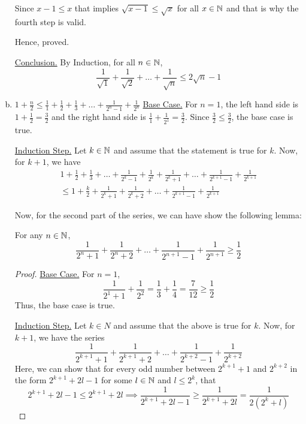 \begin{enumerate}[(a).]
		Since $x-1 \leq x$ that implies $\sqrt{x-1} \leq \sqrt{x}$ for all $x \in \mathbb{N}$ and that is why the fourth step is valid.

		Hence, proved.
		
		\underline{Conclusion.} By Induction, for all $n \in \mathbb{N}$,
		$$\frac{1}{\sqrt{1}} + \frac{1}{\sqrt{2}} + \ldots + \frac{1}{\sqrt{n}} \leq 2\sqrt{n} - 1$$
		\es
		
	\item $\displaystyle 1 + \frac{n}{2} \leq \frac{1}{1} + \frac{1}{2} + \frac{1}{3} + \ldots + \frac{1}{2^n-1} + \frac{1}{2^n}$
		\bs
		\underline{Base Case.} For $n = 1$, the left hand side is $1 + \frac{1}{2} = \frac{3}{2}$ and the right hand side is $\frac{1}{1} + \frac{1}{2^1} = \frac{3}{2}$.
		Since $\frac{3}{2} \leq \frac{3}{2}$, the base case is true.

		\underline{Induction Step.} Let $k \in \mathbb{N}$ and assume that the statement is true for $k$. Now, for $k+1$, we have
		\begin{align*}
			1 + \frac{1}{2} + \frac{1}{3} + \ldots + \frac{1}{2^k-1} + \frac{1}{2^k} + \frac{1}{2^k+1} + \ldots + \frac{1}{2^{k+1} - 1} + \frac{1}{2^{k+1}} \\
			\leq 1 + \frac{k}{2} + \frac{1}{2^k+1} + \frac{1}{2^k+2} + \ldots + \frac{1}{2^{k+1}-1} + \frac{1}{2^{k+1}}
		\end{align*}

		Now, for the second part of the series, we can have show the following lemma:
		\begin{lemma}\label{one}
			For any $n \in \mathbb{N}$, 
			$$\frac{1}{2^n + 1} + \frac{1}{2^n + 2} + \ldots + \frac{1}{2^{n+1}-1} + \frac{1}{2^{n+1}} \geq \frac{1}{2}$$
		\end{lemma}
		\begin{proof}
			\underline{Base Case.} For $n = 1$, 
			$$\frac{1}{2^1+1} + \frac{1}{2^2} = \frac{1}{3} + \frac{1}{4} = \frac{7}{12} \geq \frac{1}{2}$$
			Thus, the base case is true.

			\underline{Induction Step.} Let $k \in N$ and assume that the above is true for $k$. Now, for $k+1$, we have the series
			$$\frac{1}{2^{k+1}+1} + \frac{1}{2^{k+1}+2} + \ldots + \frac{1}{2^{k+2}-1} + \frac{1}{2^{k+2}}$$
			Here, we can show that for every odd number between $2^{k+1}+1$ and $2^{k+2}$ in the form $2^{k+1}+2l-1$ for some $l \in \mathbb{N}$ and $l \leq 2^{k}$, that
			$$2^{k+1}+2l-1 \leq 2^{k+1}+2l \implies \frac{1}{2^{k+1}+2l-1} \geq \frac{1}{2^{k+1}+2l} = \frac{1}{2(2^k + l)}$$


\end{proof}
\end{enumerate}
